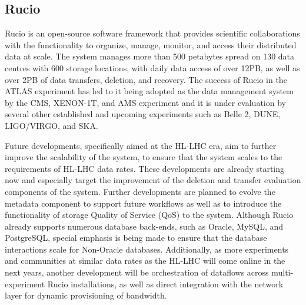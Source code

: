 \subsection{Rucio}

Rucio is an open-source software framework that provides scientific
collaborations with the functionality to organize, manage, monitor, and
access their distributed data at scale. The system manages more than 500
petabytes spread on 130 data centres with 600 storage locations, with
daily data access of over 12PB, as well as over 2PB of data transfers,
deletion, and recovery. The success of Rucio in the ATLAS experiment has
led to it being adopted as the data management system by the CMS,
XENON-1T, and AMS experiment and it is under evaluation by several other
established and upcoming experiments such as Belle 2, DUNE, LIGO/VIRGO,
and SKA.

Future developments, specifically aimed at the HL-LHC era, aim to
further improve the scalability of the system, to ensure that the system
scales to the requirements of HL-LHC data rates. These developments are
already starting now and especially target the improvement of the
deletion and transfer evaluation components of the system. Further
developments are planned to evolve the metadata component to support
future workflows as well as to introduce the functionality of storage
Quality of Service (QoS) to the system. Although Rucio already supports
numerous database back-ends, such as Oracle, MySQL, and PostgreSQL,
special emphasis is being made to ensure that the database interactions
scale for Non-Oracle databases. Additionally, as more experiments and
communities at similar data rates as the HL-LHC will come online in the
next years, another development will be orchestration of dataflows
across multi-experiment Rucio installations, as well as direct
integration with the network layer for dynamic provisioning of bandwidth.


